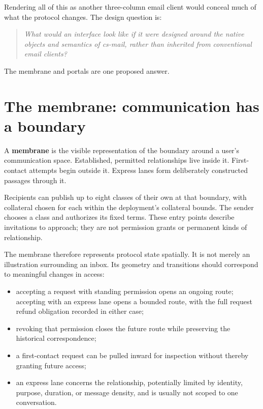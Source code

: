\documentclass[11pt]{article}
\newcommand{\csmail}{\textit{cs-mail}}
\newcommand{\term}[1]{\textbf{#1}}
\begin{document}
Rendering all of this as another three-column email client would conceal much of what the protocol changes. The design question is:

\begin{quote}
\emph{What would an interface look like if it were designed around the native objects and semantics of \csmail{}, rather than inherited from conventional email clients?}
\end{quote}

The membrane and portals are one proposed answer.

\section{The membrane: communication has a boundary}

A \term{membrane} is the visible representation of the boundary around a user's communication space. Established, permitted relationships live inside it. First-contact attempts begin outside it. Express lanes form deliberately constructed passages through it.

Recipients can publish up to eight classes of their own at that boundary, with collateral chosen for each within the deployment's collateral bounds. The sender chooses a class and authorizes its fixed terms. These entry points describe invitations to approach; they are not permission grants or permanent kinds of relationship.

The membrane therefore represents protocol state spatially. It is not merely an illustration surrounding an inbox. Its geometry and transitions should correspond to meaningful changes in access:

\begin{itemize}[leftmargin=*]
    \item accepting a request with standing permission opens an ongoing route; accepting with an express lane opens a bounded route, with the full request refund obligation recorded in either case;
    \item revoking that permission closes the future route while preserving the historical correspondence;
    \item a first-contact request can be pulled inward for inspection without thereby granting future access;
    \item an express lane concerns the relationship, potentially limited by identity, purpose, duration, or message density, and is usually not scoped to one conversation.
\end{itemize}
\end{document}
